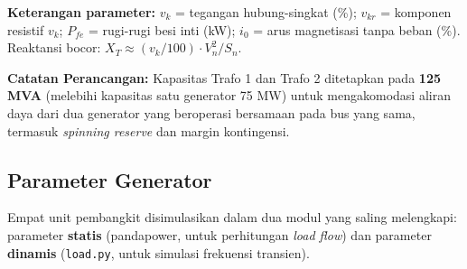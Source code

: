 \noindent\textbf{Keterangan parameter:}
$v_k$ = tegangan hubung-singkat (\%); $v_{kr}$ = komponen resistif $v_k$; $P_{fe}$ = rugi-rugi besi inti (kW); $i_0$ = arus magnetisasi tanpa beban (\%).
Reaktansi bocor: $X_T \approx (v_k/100) \cdot V_n^2/S_n$.

\noindent\textbf{Catatan Perancangan:} Kapasitas Trafo 1 dan Trafo 2 ditetapkan pada \textbf{125 MVA} (melebihi kapasitas satu generator 75 MW) untuk mengakomodasi aliran daya dari dua generator yang beroperasi bersamaan pada bus yang sama, termasuk \textit{spinning reserve} dan margin kontingensi.

\subsection{Parameter Generator}
\label{subsec:Parameter_Generator}

Empat unit pembangkit disimulasikan dalam dua modul yang saling melengkapi:
parameter \textbf{statis} (pandapower, untuk perhitungan \textit{load flow}) dan parameter \textbf{dinamis} (\texttt{load.py}, untuk simulasi frekuensi transien).

